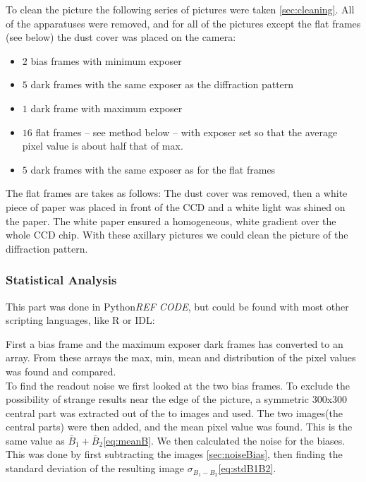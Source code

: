 \documentclass{emulateapj}
\begin{document}
To clean the picture the following series of pictures were taken \ref{sec:cleaning}. All of the apparatuses were removed, and for all of the pictures except the flat frames (see below) the dust cover was placed on the camera: \\


\begin{itemize}
\item $2$ bias frames with minimum exposer
\item $5$ dark frames with the same exposer as the diffraction pattern
\item $1$ dark frame with maximum exposer
\item $16$ flat frames -- see method below -- with exposer set so that the average pixel value is about half that of max.
\item $5$ dark frames with the same exposer as for the flat frames
\end{itemize}

The flat frames are takes as follows: The dust cover was removed, then a white piece of paper was placed in front of the CCD and a white light was shined on the paper. The white paper ensured a homogeneous, white gradient over the whole CCD chip. With these axillary pictures we could clean the picture of the diffraction pattern.

\subsubsection{Statistical Analysis}
This part was done in Python\emph{REF CODE}, but could be found with most other scripting languages, like R or IDL:

First a bias frame and the maximum exposer dark frames has converted to an array. From these arrays the max, min, mean and distribution of the pixel values was found and compared. \\

To find the readout noise we first looked at the two bias frames. To exclude the possibility of strange results near the edge of the picture, a symmetric $300$x$300$ central part was extracted out of the to images and used. The two  images(the central parts) were then added, and the mean pixel value was found. This is the same value as $\bar{B}_1 + \bar{B}_2$\eqref{eq:meanB}. We then calculated the noise for the biases. This was done by first subtracting the images \ref{sec:noiseBias}, then finding the standard deviation of the resulting image $\sigma_{B_1 - B_2}$\eqref{eq:stdB1B2}.
\end{document}
